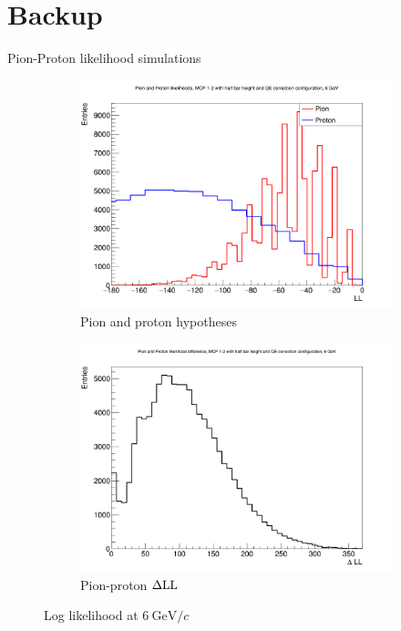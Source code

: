 \documentclass{beamer}
\begin{document}
\section{Backup}
\begin{frame}{Pion-Proton likelihood simulations}
  \begin{figure}
    \centering
    \vspace{-0.2cm}
    \begin{subfigure}{0.5\textwidth}
      \includegraphics[width = 1.0\textwidth]{Plots/ProtonPionLL6GeVStandardMCPAB.png}
      \caption{Pion and proton hypotheses}
    \end{subfigure}%
    \begin{subfigure}{0.5\textwidth}
      \includegraphics[width = 1.0\textwidth]{Plots/ProtonPionDLL6GeVStandardMCPAB.png}
      \caption{Pion-proton $\Delta{\rm LL}$}
    \end{subfigure}
    \caption{Log likelihood at $\SI{6}{\giga\eV/c}$}
  \end{figure}
\end{frame}
\end{document}
